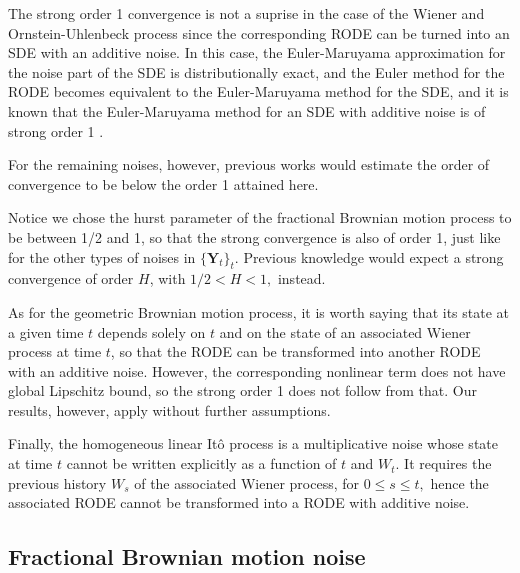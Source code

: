 \documentclass[reqno,12pt]{amsart}
\theoremstyle{plain} %
\theoremstyle{definition} %
\begin{document}
The strong order 1 convergence is not a suprise in the case of the Wiener and Ornstein-Uhlenbeck process since the corresponding RODE can be turned into an SDE with an additive noise. In this case, the Euler-Maruyama approximation for the noise part of the SDE is distributionally exact, and the Euler method for the RODE becomes equivalent to the Euler-Maruyama method for the SDE, and it is known that the Euler-Maruyama method for an SDE with additive noise is of strong order 1 \cite{HighamKloeden2021}.

For the remaining noises, however, previous works would estimate the order of convergence to be below the order 1 attained here.

Notice we chose the hurst parameter of the fractional Brownian motion process to be between 1/2 and 1, so that the strong convergence is also of order 1, just like for the other types of noises in $\{\mathbf{Y}_t\}_t$. Previous knowledge would expect a strong convergence of order $H$, with $1/2 < H < 1,$ instead.

As for the geometric Brownian motion process, it is worth saying that its state at a given time $t$ depends solely on $t$ and on the state of an associated Wiener process at time $t$, so that the RODE can be transformed into another RODE with an additive noise. However, the corresponding nonlinear term does not have global Lipschitz bound, so the strong order 1 does not follow from that. Our results, however, apply without further assumptions.

Finally, the homogeneous linear It\^o process is a multiplicative noise whose state at time $t$ cannot be written explicitly as a function of $t$ and $W_t.$ It requires the previous history $W_s$ of the associated Wiener process, for $0\leq s \leq t,$ hence the associated RODE cannot be transformed into a RODE with additive noise.

\subsection{Fractional Brownian motion noise}
\label{secfBmnoise}
\end{document}
